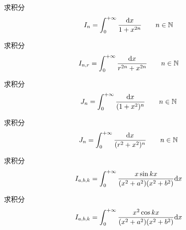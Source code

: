 \begin{homeworkProblem}
    求积分
    \[
    I_{n} = \int_0^{+\infty}\frac{\mathrm{d}x}{1+x^{2n}}\qquad n\in\mathbb{N}
    \]
\end{homeworkProblem}
\begin{homeworkProblem}
    求积分
    \[
    I_{n,r} = \int_0^{+\infty}\frac{\mathrm{d}x}{r^{2n}+x^{2n}}\qquad n\in\mathbb{N}
    \]
\end{homeworkProblem}
\begin{homeworkProblem}
    求积分
    \[
    J_n = \int_0^{+\infty}\frac{\mathrm{d}x}{(1+x^2)^n} \qquad n\in\mathbb{N}
    \]
\end{homeworkProblem}
\begin{homeworkProblem}
    求积分
    \[
    J_n = \int_0^{+\infty}\frac{\mathrm{d}x}{(r^2+x^2)^n} \qquad n\in\mathbb{N}
    \]
\end{homeworkProblem}
\begin{homeworkProblem}
    求积分
    \[
    I_{a,b,k} = \int_0^{+\infty}\frac{x\sin kx}{(x^2+a^2)(x^2+b^2)}\mathrm{d}x
    \]
\end{homeworkProblem}
\begin{homeworkProblem}
    求积分
    \[
    I_{a,b,k} = \int_0^{+\infty}\frac{x^2\cos kx}{(x^2+a^2)(x^2+b^2)}\mathrm{d}x
    \]
\end{homeworkProblem}
